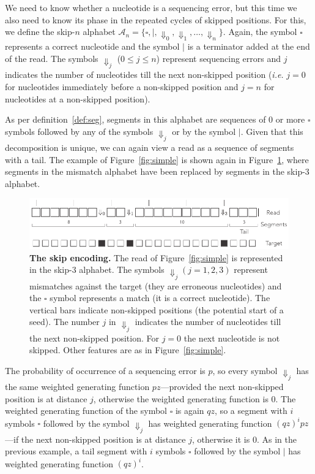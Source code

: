 \documentclass{article}
\begin{document}
We need to know whether a nucleotide is a sequencing error, but this time
we also need to know its phase in the repeated cycles of skipped
positions. For this, we define the skip-$n$ alphabet $\mathcal{A}_n =
\{\square, |, \Downarrow_0, \Downarrow_1, \ldots, \Downarrow_n \}$. Again,
the symbol $\square$ represents a correct nucleotide and the symbol $|$ is
a terminator added at the end of the read. The symbols $\Downarrow_j$ ($ 0
\leq j \leq n$) represent sequencing errors and $j$ indicates the number
of nucleotides till the next non-skipped position (\textit{i.e.} $j=0$ for
nucleotides immediately before a non-skipped position and $j=n$ for
nucleotides at a non-skipped position).

As per definition~\ref{def:seg}, segments in this alphabet are sequences
of 0 or more $\square$ symbols followed by any of the symbols
$\Downarrow_j$ or by the symbol $|$. Given that this decomposition is
unique, we can again view a read as a sequence of segments with a tail.
The example of Figure~\ref{fig:simple} is shown again in
Figure~\ref{fig:skip}, where segments in the mismatch alphabet have been
replaced by segments in the skip-3 alphabet.

\begin{figure}[h]
\centering
\includegraphics[scale=0.85]{sketch_skip.pdf}
\caption{\textbf{The skip encoding.}
The read of Figure~\ref{fig:simple} is represented in the skip-3 alphabet.
The symbols $\Downarrow_j (j = 1,2,3)$ represent mismatches against the
target (they are erroneous nucleotides) and the $\square$ symbol
represents a match (it is a correct nucleotide). The vertical bars
indicate non-skipped positions (the potential start of a seed). The number
$j$ in $\Downarrow_j$ indicates the number of nucleotides till the next
non-skipped position. For $j=0$ the next nucleotide is not skipped.
Other features are as in Figure~\ref{fig:simple}.}
\label{fig:skip}
\end{figure}

The probability of occurrence of a sequencing error is $p$, so every
symbol $\Downarrow_j$ has the same weighted generating function
$pz$---provided the next non-skipped position is at distance $j$,
otherwise the weighted generating function is 0. The weighted generating
function of the symbol $\square$ is again $qz$, so a segment with $i$
symbols $\square$ followed by the symbol $\Downarrow_j$ has weighted
generating function $(qz)^ipz$---if the next non-skipped position is at
distance $j$, otherwise it is 0. As in the previous example, a tail
segment with $i$ symbols $\square$ followed by the symbol $|$ has weighted
generating function $(qz)^i$.
\end{document}
